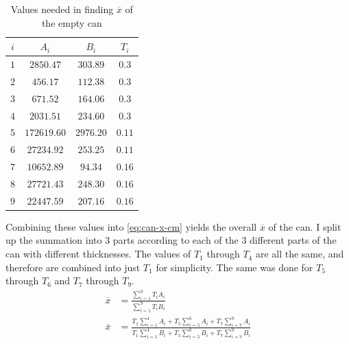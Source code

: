 \documentclass[11pt]{article}
\begin{document}
    \begin{table}[H]
        \scriptsize
        \renewcommand{\arraystretch}{0.9}
        \centering
        \caption{Values needed in finding $\overline{x}$ of the empty can}
        \vspace{-8pt}
        \begin{tabular}{|c|c|c|c|}
            \hline
             $i$ & $A_i$ & $B_i$ & $T_i$ \\
             \hline \hline
             $1$ & $2850.47$ & $303.89$ & $0.3$ \\
             \hline
             $2$ & $456.17$ & $112.38$ & $0.3$ \\
             \hline
             $3$ & $671.52$ & $164.06$ & $0.3$ \\
             \hline
             $4$ & $2031.51$ & $234.60$ & $0.3$ \\
             \hline
             $5$ & $172619.60$ & $2976.20$ & $0.11$ \\
             \hline
             $6$ & $27234.92$ & $253.25$ & $0.11$ \\
             \hline
             $7$ & $10652.89$ & $94.34$ & $0.16$ \\
             \hline
             $8$ & $27721.43$ & $248.30$ & $0.16$ \\
             \hline
             $9$ & $22447.59$ & $207.16$ & $0.16$ \\
             \hline
        \end{tabular}
        \label{tab:can-x-integrals}
    \end{table}
    \vspace{-10pt}

    Combining these values into \eqref{eq:can-x-cm} yields the overall $\overline{x}$ of the can. I split up the summation into $3$ parts according to each of the $3$ different parts of the can with different thicknesses. The values of $T_1$ through $T_4$ are all the same, and therefore are combined into just $T_1$ for simplicity. The same was done for $T_5$ through $T_6$ and $T_7$ through $T_9$.
    {\footnotesize\begin{align*}
        \overline{x} &= \frac{\sum_{i=1}^9 T_i A_i}{\sum_{i=1}^9 T_i B_i} \\
        \overline{x} &= \frac{T_1 \sum_{i=1}^4 A_i + T_5 \sum_{i=5}^6 A_i + T_7 \sum_{i=7}^9 A_i}{T_1 \sum_{i=1}^4 B_i + T_5 \sum_{i=5}^6 B_i + T_7 \sum_{i=7}^9 B_i}
    \end{align*}}
\end{document}
